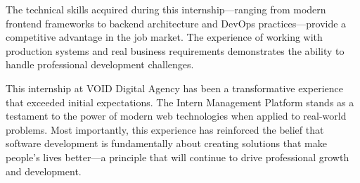 \medskip
\noindent
The technical skills acquired during this internship—ranging from modern frontend frameworks to backend architecture and DevOps practices—provide a competitive advantage in the job market. The experience of working with production systems and real business requirements demonstrates the ability to handle professional development challenges.

\medskip
\noindent
This internship at VOID Digital Agency has been a transformative experience that exceeded initial expectations. The Intern Management Platform stands as a testament to the power of modern web technologies when applied to real-world problems. Most importantly, this experience has reinforced the belief that software development is fundamentally about creating solutions that make people's lives better—a principle that will continue to drive professional growth and development.


